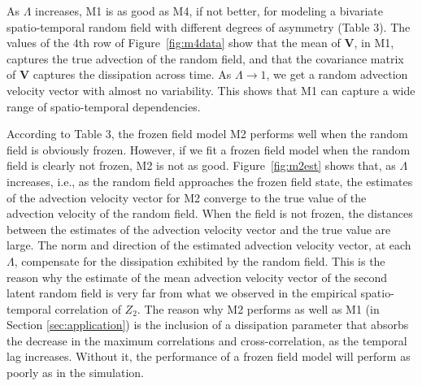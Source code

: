 \documentclass[12pt]{article}
\newcommand{\0}{\mathbf{0}}
\begin{document}
\begin{table}[b!]
\centering
{}
\end{table}


As $\Lambda$ increases, M1 is as good as M4, if not better, for modeling a bivariate spatio-temporal random field with different degrees of asymmetry (Table 3). The values of the $4$th row of Figure~\ref{fig:m4data} show that the mean of $\mathbf{V}$, in M1, captures the true advection of the random field, and that the covariance matrix of $\mathbf{V}$ captures the dissipation across time. As $\Lambda\rightarrow 1$, we get a random advection velocity vector with almost no variability. This shows that M1 can capture a wide range of spatio-temporal dependencies. 

According to Table 3, the frozen field model M2 performs well when the random field is obviously frozen. However, if we fit a frozen field model when the random field is clearly not frozen, M2 is not as good. Figure~\ref{fig:m2est} shows that, as $\Lambda$ increases, i.e., as the random field approaches the frozen field state, the estimates of the advection velocity vector for M2 converge to the true value of the advection velocity of the random field. When the field is not frozen, the distances between the estimates of the advection velocity vector and the true value are large. The norm and direction of the estimated advection velocity vector, at each $\Lambda$, compensate for the dissipation exhibited by the random field. This is the reason why the estimate of the mean advection velocity vector of the second latent random field is very far from what we observed in the empirical spatio-temporal correlation of $Z_2$. The reason why M2 performs as well as M1 (in Section \ref{sec:application}) is the inclusion of a dissipation parameter that absorbs the decrease in the maximum correlations and cross-correlation, as the temporal lag increases. Without it, the performance of a frozen field model will perform as poorly as in the simulation.
\end{document}

